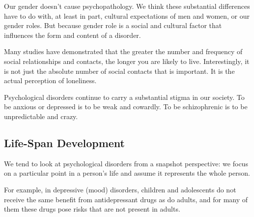 Our gender doesn’t cause psychopathology.
We think these substantial differences have to do with, at least in part, cultural expectations of men and women, or our gender roles.
But because gender role is a social and cultural factor that influences the form and content of a disorder.

Many studies have demonstrated that the greater the number and frequency of social relationships and contacts, the longer you are likely to live.
Interestingly, it is not just the absolute number of social contacts that is important.
It is the actual perception of loneliness.

Psychological disorders continue to carry a substantial stigma in our society.
To be anxious or depressed is to be weak and cowardly.
To be schizophrenic is to be unpredictable and crazy.

\subsection{Life-Span Development}\label{subsec:Life-Span_Development}
We tend to look at psychological disorders from a snapshot perspective: we focus on a particular point in a person’s life and assume it represents the whole person.

For example, in depressive (mood) disorders, children and adolescents do not receive the same benefit from antidepressant drugs as do adults, and for many of them these drugs pose risks that are not present in adults.

